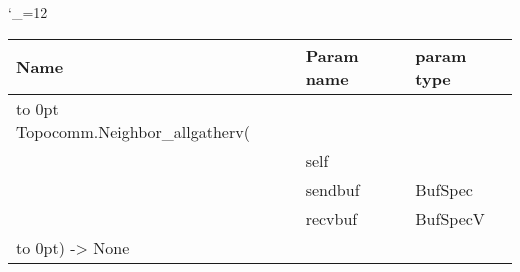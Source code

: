 \begingroup \catcode`\_=12 \tt
\begin{tabular}{lll}
\toprule
\textrm{Name}&\textrm{Param name}&\textrm{param type}\\
\midrule
\hbox to 0pt {Topocomm.Neighbor_allgatherv(\hss}\\
& self\\
& sendbuf & BufSpec\\
& recvbuf & BufSpecV\\
\hbox to 0pt{) -> None\hss}\\
\bottomrule
\end{tabular}
\endgroup
